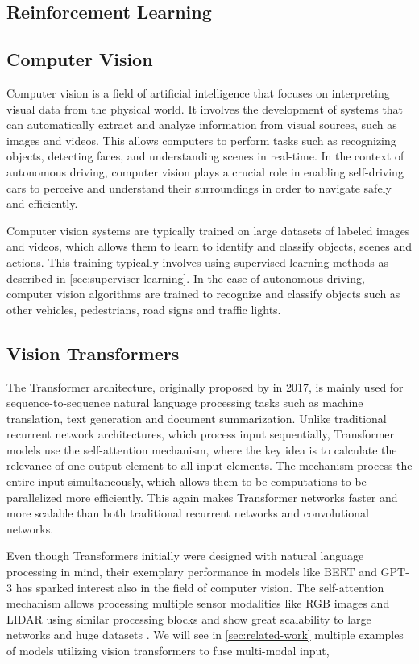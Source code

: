 \subsection{Reinforcement Learning}

\subsection{Computer Vision}
Computer vision is a field of artificial intelligence that focuses on interpreting visual data from the physical world. It involves the development of systems that can automatically extract and analyze information from visual sources, such as images and videos. This allows computers to perform tasks such as recognizing objects, detecting faces, and understanding scenes in real-time. In the context of autonomous driving, computer vision plays a crucial role in enabling self-driving cars to perceive and understand their surroundings in order to navigate safely and efficiently.

Computer vision systems are typically trained on large datasets of labeled images and videos, which allows them to learn to identify and classify objects, scenes and actions. This training typically involves using supervised learning methods as described in \cref{sec:superviser-learning}. In the case of autonomous driving, computer vision algorithms are trained to recognize and classify objects such as other vehicles, pedestrians, road signs and traffic lights.

\subsection{Vision Transformers}
The Transformer architecture, originally proposed by \textcite{attention-is-all-you-need} in 2017, is mainly used for sequence-to-sequence natural language processing tasks such as machine translation, text generation and document summarization. Unlike traditional recurrent network architectures, which process input sequentially, Transformer models use the self-attention mechanism, where the key idea is to calculate the relevance of one output element to all input elements.  The mechanism process the entire input simultaneously, which allows them to be computations to be parallelized more efficiently. This again makes Transformer networks faster and more scalable than both traditional recurrent networks and convolutional networks. 

Even though Transformers initially were designed with natural language processing in mind, their exemplary performance in models like BERT \cite{bert} and GPT-3 \cite{gpt-3} has sparked interest also in the field of computer vision. The self-attention mechanism allows processing multiple sensor modalities like RGB images and LIDAR using similar processing blocks and show great scalability to large networks and huge datasets \cite{transformers-in-vision-survey}. We will see in \cref{sec:related-work} multiple examples of models utilizing vision transformers to fuse multi-modal input, %


